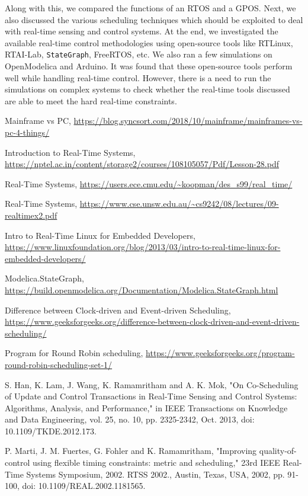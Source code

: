 \documentclass[12pt]{report}
\begin{document}
Along with this, we compared the functions of an RTOS and a GPOS. Next, we also discussed the various scheduling techniques which should be exploited to deal with real-time sensing and control systems. At the end, we investigated the available real-time control methodologies using open-source tools like RTLinux, RTAI-Lab, \texttt{StateGraph}, FreeRTOS, etc. We also ran a few simulations on OpenModelica and Arduino. It was found that these open-source tools perform well while handling real-time control. However, there is a need to run the simulations on complex systems to check whether the real-time tools discussed are able to meet the hard real-time constraints. 

\begin{thebibliography}{111}
Mainframe vs PC, \url{https://blog.syncsort.com/2018/10/mainframe/mainframes-vs-pc-4-things/}

Introduction to Real-Time Systems, \url{https://nptel.ac.in/content/storage2/courses/108105057/Pdf/Lesson-28.pdf}

Real-Time Systems, \url{https://users.ece.cmu.edu/~koopman/des_s99/real_time/}

Real-Time Systems, \url{https://www.cse.unsw.edu.au/~cs9242/08/lectures/09-realtimex2.pdf}

Intro to Real-Time Linux for Embedded Developers, \url{https://www.linuxfoundation.org/blog/2013/03/intro-to-real-time-linux-for-embedded-developers/}

Modelica.StateGraph, \url{https://build.openmodelica.org/Documentation/Modelica.StateGraph.html}

Difference between Clock-driven and Event-driven Scheduling, \url{https://www.geeksforgeeks.org/difference-between-clock-driven-and-event-driven-scheduling/}

Program for Round Robin scheduling, \url{https://www.geeksforgeeks.org/program-round-robin-scheduling-set-1/}

S. Han, K. Lam, J. Wang, K. Ramamritham and A. K. Mok, "On Co-Scheduling of Update and Control Transactions in Real-Time Sensing and Control Systems: Algorithms, Analysis, and Performance," in IEEE Transactions on Knowledge and Data Engineering, vol. 25, no. 10, pp. 2325-2342, Oct. 2013, doi: 10.1109/TKDE.2012.173.

P. Marti, J. M. Fuertes, G. Fohler and K. Ramamritham, "Improving quality-of-control using flexible timing constraints: metric and scheduling," 23rd IEEE Real-Time Systems Symposium, 2002. RTSS 2002., Austin, Texas, USA, 2002, pp. 91-100, doi: 10.1109/REAL.2002.1181565.


\end{thebibliography}
\end{document}
